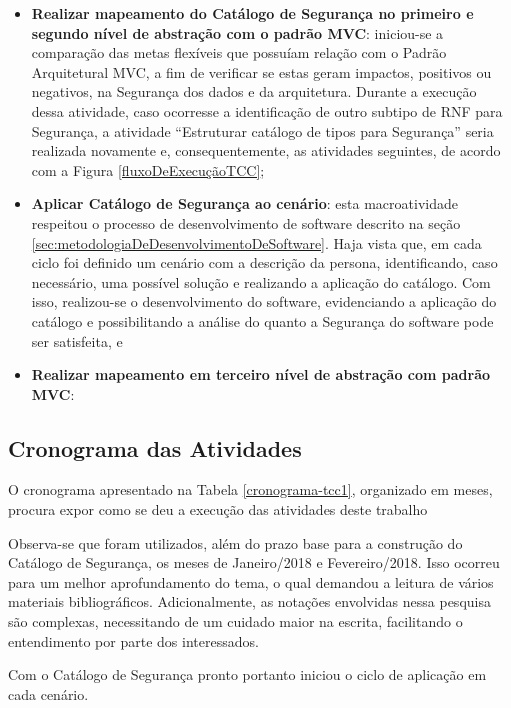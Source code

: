 \begin{itemize}
	\item \textbf{Realizar mapeamento do Catálogo de Segurança no primeiro e segundo nível de abstração com o padrão MVC}: iniciou-se a comparação das metas flexíveis que possuíam relação com o Padrão Arquitetural MVC, a fim de verificar se estas geram impactos, positivos ou negativos, na Segurança dos dados e da arquitetura. Durante a execução dessa atividade, caso ocorresse a identificação de outro subtipo de RNF para Segurança, a atividade “Estruturar catálogo de tipos para Segurança” seria realizada novamente e, consequentemente, as atividades seguintes, de acordo com a Figura \ref{fluxoDeExecuçãoTCC};
	
	\item \textbf{Aplicar Catálogo de Segurança ao cenário}: esta macroatividade respeitou o processo de desenvolvimento de software descrito na seção \ref{sec:metodologiaDeDesenvolvimentoDeSoftware}. Haja vista que, em cada ciclo foi definido um cenário com a descrição da persona, identificando, caso necessário, uma possível solução e realizando a aplicação do catálogo. Com isso, realizou-se o desenvolvimento do software, evidenciando a aplicação do catálogo e possibilitando a análise do quanto a Segurança do software pode ser satisfeita, e
	
	\item  \textbf{Realizar mapeamento em terceiro nível de abstração com padrão MVC}:
\end{itemize}


\subsection{Cronograma das Atividades}

O cronograma apresentado na Tabela \ref{cronograma-tcc1}, organizado em meses,  procura expor como se deu a execução das atividades deste trabalho

Observa-se que foram utilizados, além do prazo base para a construção do Catálogo de Segurança, os meses de Janeiro/2018 e Fevereiro/2018. Isso ocorreu para um melhor aprofundamento do tema, o qual demandou a leitura de vários materiais bibliográficos. Adicionalmente, as notações envolvidas nessa pesquisa são complexas, necessitando de um cuidado maior na escrita, facilitando o entendimento por parte dos interessados.

Com o Catálogo de Segurança pronto portanto iniciou o ciclo de aplicação em cada cenário. 


